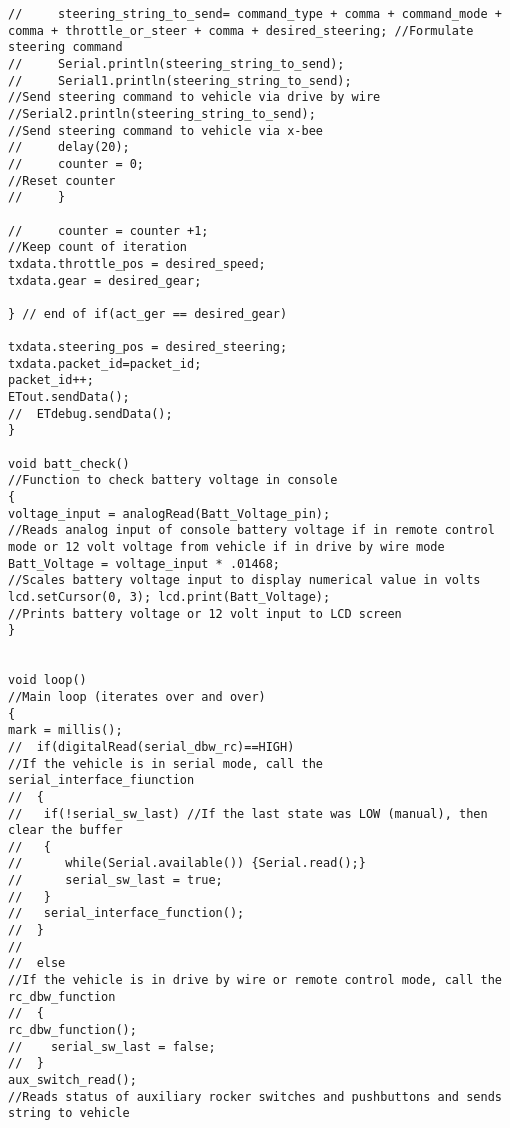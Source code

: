 \begin{lstlisting}[breaklines=true,basicstyle=\tiny]
//     steering_string_to_send= command_type + comma + command_mode + comma + throttle_or_steer + comma + desired_steering; //Formulate steering command
//     Serial.println(steering_string_to_send);
//     Serial1.println(steering_string_to_send);                                         //Send steering command to vehicle via drive by wire
//Serial2.println(steering_string_to_send);                                         //Send steering command to vehicle via x-bee
//     delay(20);
//     counter = 0;                                                                      //Reset counter
//     }

//     counter = counter +1;                                                             //Keep count of iteration
txdata.throttle_pos = desired_speed;
txdata.gear = desired_gear;

} // end of if(act_ger == desired_gear)

txdata.steering_pos = desired_steering;
txdata.packet_id=packet_id;
packet_id++;
ETout.sendData();
//  ETdebug.sendData();
}

void batt_check()                                                                      //Function to check battery voltage in console
{
voltage_input = analogRead(Batt_Voltage_pin);                                        //Reads analog input of console battery voltage if in remote control mode or 12 volt voltage from vehicle if in drive by wire mode
Batt_Voltage = voltage_input * .01468;                                               //Scales battery voltage input to display numerical value in volts
lcd.setCursor(0, 3); lcd.print(Batt_Voltage);                                        //Prints battery voltage or 12 volt input to LCD screen
}


void loop()                                                                            //Main loop (iterates over and over)
{
mark = millis();
//  if(digitalRead(serial_dbw_rc)==HIGH)                                                 //If the vehicle is in serial mode, call the serial_interface_fiunction
//  {
//   if(!serial_sw_last) //If the last state was LOW (manual), then clear the buffer
//   {
//      while(Serial.available()) {Serial.read();}
//      serial_sw_last = true; 
//   }
//   serial_interface_function();
//  }
//  
//  else                                                                                 //If the vehicle is in drive by wire or remote control mode, call the rc_dbw_function
//  {
rc_dbw_function();
//    serial_sw_last = false;
//  }
aux_switch_read();                                                                  //Reads status of auxiliary rocker switches and pushbuttons and sends string to vehicle 


\end{lstlisting}
